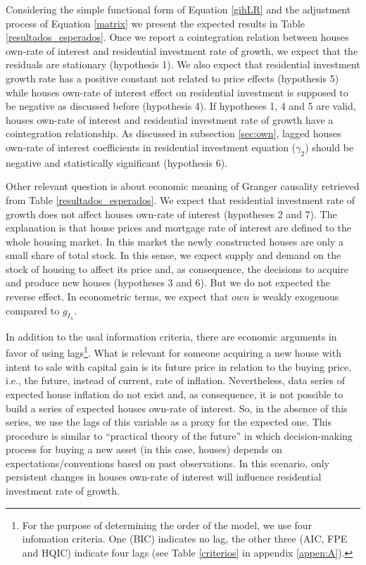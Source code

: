 \documentclass[12pt, a4paper]{article}
\begin{document}
Considering the simple functional form of Equation \ref{gihLR} and the adjustment process of Equation \ref{matrix} we present the expected results in Table \ref{resultados_esperados}.
Once we report a cointegration relation between houses own-rate of interest and residential investment rate of growth, we expect that the residuals are stationary (hypothesis 1).
We also expect that residential investment growth rate has a positive constant not related to price effects (hypothesis 5) while houses own-rate of interest effect on residential investment is supposed to be negative as discussed before (hypothesis 4).
If  hypotheses 1, 4 and 5 are valid, houses own-rate of interest and residential investment rate of growth have a cointegration relationship.
As discussed in subsection \ref{sec:own}, lagged houses own-rate of interest coefficients in residential investment equation (\(\gamma_{2}\)) should be negative and statistically significant (hypothesis 6).






Other relevant question is about economic meaning of Granger causality retrieved from Table \ref{resultados_esperados}.
We expect that residential investment rate of growth does not affect  houses own-rate of interest (hypotheses 2 and 7).
The explanation is that house prices and mortgage rate of interest are defined to the whole housing market.
In this market the newly constructed houses are only a small share of total stock.
In this sense, we expect supply and demand on the stock of housing to affect its price and, as consequence,  the decisions to acquire and produce new houses (hypotheses 3 and 6).
But we do not expected the reverse effect.
In econometric terms, we expect that \(own\) is weakly exogenous compared to \(g_{I_{h}}\).

In addition to the usal information criteria, there are economic arguments in favor of using lags\footnote{For the purpose of determining the order of the model, we use four infomation criteria. One (BIC) indicates no lag, the other three (AIC, FPE and HQIC) indicate four lags (see Table \ref{criterios} in appendix \ref{appen:A}).}.
What is relevant for someone acquiring a new house with intent to sale with capital gain is its future price in relation to the buying price, i.e., the future, instead of current, rate of inflation.
Nevertheless, data series of expected house inflation do not exist and, as consequence, it is not possible to build a series of expected houses own-rate of interest.
So, in the absence of this series, we use the lags of this variable as a proxy for the expected one.
This procedure is similar to \textcite{keynes_general_1937}  ``practical theory of the future'' in which decision-making process for buying a new asset (in this case, houses) depends on expectations/conventions based on past observations.
In this scenario, only persistent changes in houses own-rate of interest will influence residential investment rate of growth.
\end{document}
